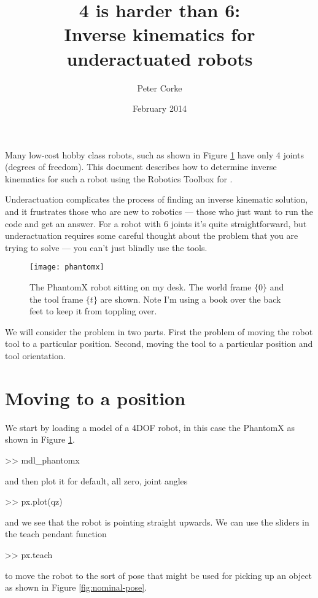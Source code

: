 \documentclass[11pt]{article}
\title{{\Huge 4 is harder than 6:}\\ Inverse kinematics for underactuated robots}
\author{Peter Corke}
\date{February 2014}                                           %
\begin{document}
\maketitle

Many low-cost hobby class robots, such as shown in Figure \ref{fig:phantomx} have only 4 joints (degrees of freedom). 
This document describes how to determine inverse kinematics for such a robot using the Robotics
Toolbox\cite{Corke11a} for \Mlab.

Underactuation complicates the process of finding an inverse kinematic solution, and it frustrates those who are new to robotics ---
those who just want to run the code and get an answer.
For a robot with 6 joints it's quite straightforward, but underactuation 
requires some careful thought about the problem that you are trying to solve --- you can't just blindly use
the tools.



	\begin{figure}[b]
	\centering
	\texttt{[image: phantomx]}
	\caption{The PhantomX robot sitting on my desk.  The world frame $\{\!0\!\}$ and the tool frame $\{\!t\!\}$
	are shown.
	Note I'm using a book over the back feet to keep it from
	toppling over.}
	\label{fig:phantomx}
	\end{figure}


We will consider the problem in two parts.  First the problem of moving the robot tool to a particular position.  Second, moving the tool
to a particular position and tool orientation.

\section{Moving to a position}
We start by loading a model of a 4DOF robot, in this case the PhantomX as shown in Figure \ref{fig:phantomx}.
\begin{Code}
>> mdl_phantomx
\end{Code}
and then plot it for default, all zero, joint angles
\begin{Code}
>> px.plot(qz)
\end{Code}
and we see that the robot is pointing straight upwards.
We can use the sliders in the teach pendant function
\begin{Code}
>> px.teach
\end{Code}
to move the robot to the sort of pose that might be used for picking up an object as shown in Figure \ref{fig:nominal-pose}.
\end{document}
